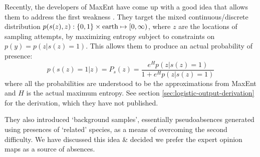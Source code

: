 Recently, the developers of MaxEnt have come up with a good idea that allows them to address the first weakness \cite{Phillips:2008p12219}. They target the mixed continuous/discrete distribution $p(s(z), z) : \{0,1\}\times\textup{earth}\mapsto [0,\infty)$, where $z$ are the locations of sampling attempts, by maximizing entropy subject to constraints on $p(y)=p(z|s(z)=1)$. This allows them to produce an actual probability of presence:
\begin{equation}
    \label{eq:presence-probability} 
    p(s(z)=1|z) = P_s(z)=\frac{e^H p(z|s(z)=1)}{1+e^H p(z|s(z)=1)}
\end{equation}
where all the probabilities are understood to be the approximations from MaxEnt and $H$ is the actual maximum entropy. See section \ref{sec:logistic-output-derivation} for the derivation, which they have not published. 

They also introduced `background samples', essentially pseudoabsences generated using presences of `related' species, as a means of overcoming the second difficulty. We have discussed this idea \& decided we prefer the expert opinion maps as a source of absences.


